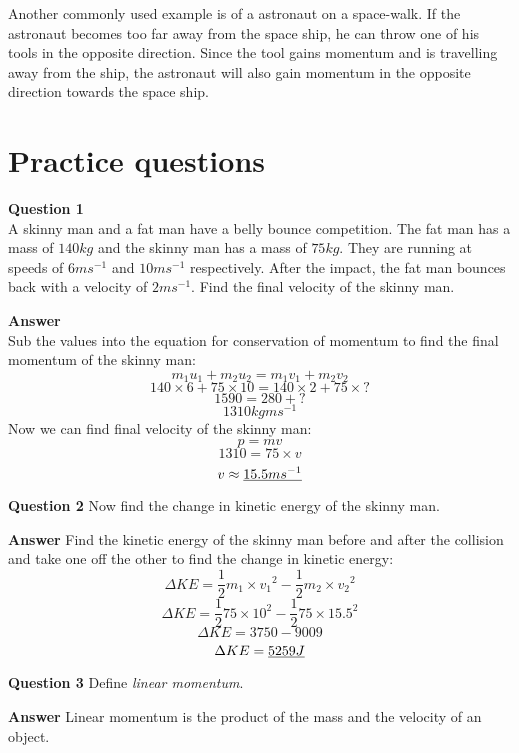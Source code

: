 \documentclass{article}
\begin{document}
Another commonly used example is of a astronaut on a space-walk. If the astronaut becomes too far away from the space ship, he can throw one of his tools in the opposite direction. Since the tool gains momentum and is travelling away from the ship, the astronaut will also gain momentum in the opposite direction towards the space ship.


\section*{Practice questions}
\label{sec:PracticeQuestions}
\textbf{Question 1}\\
A skinny man and a fat man have a belly bounce competition. The fat man has a mass of $140kg$ and the skinny man has a mass of $75kg$. They are running at speeds of $6ms^{-1}$ and $10ms^{-1}$ respectively. After the impact, the fat man bounces back with a velocity of $2ms^{-1}$. Find the final velocity of the skinny man.

\textbf{Answer} \\
Sub the values into the equation for conservation of momentum to find the final momentum of the skinny man:
\[
	m_1 u_1 + m_2 u_2 = m_1 v_1 + m_2 v_2
\]
\[
	140 \times 6 + 75 \times 10 = 140 \times 2 + 75 \times ?
\]
\[
	1590 = 280 + ?
\]
\[
	1310 kgms^{-1}
\]
Now we can find final velocity of the skinny man:
\[
	p = mv
\]
\[
	1310 = 75 \times v
\]
\[
	v \approx \uline{15.5ms^{-1}}
\]

\textbf{Question 2}
Now find the change in kinetic energy of the skinny man.

\textbf{Answer}
Find the kinetic energy of the skinny man before and after the collision and take one off the other to find the change in kinetic energy:
\[
	\Delta KE = \frac{1}{2}m_1 \times {v_1}^2 - \frac{1}{2}m_2 \times {v_2}^2
\]
\[
	\Delta KE = \frac{1}{2}75 \times 10^2 - \frac{1}{2}75 \times 15.5^2
\]
\[
	\Delta KE = 3750 - 9009
\]
\[
	\Delta KE = \uline{5259J}
\]

\textbf{Question 3}
Define \textit{linear momentum}.

\textbf{Answer}
Linear momentum is the product of the mass and the velocity of an object.
\end{document}
